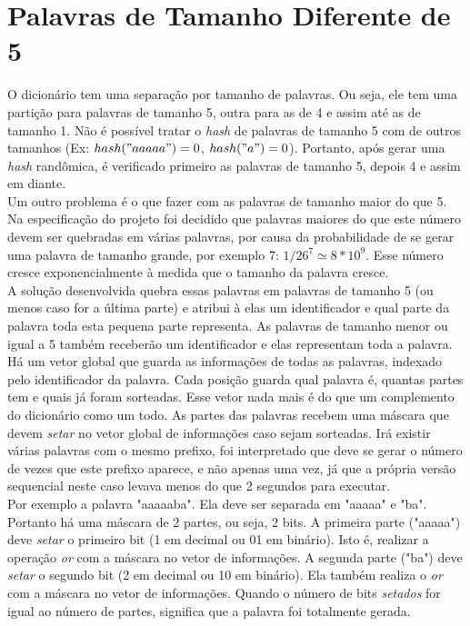 \documentclass[a4paper]{article}
\begin{document}
\section{Palavras de Tamanho Diferente de 5}
\indent \indent O dicionário tem uma separação por tamanho de palavras. Ou seja, ele tem uma partição para palavras de tamanho 5, outra para as de 4 e assim até as de tamanho 1. Não é possível tratar o \emph{hash} de palavras de tamanho 5 com de outros tamanhos (Ex: \begin{math}hash("aaaaa") = 0\end{math}, \begin{math}hash("a") = 0\end{math}). Portanto, após gerar uma \emph{hash} randômica, é verificado primeiro as palavras de tamanho 5, depois 4 e assim em diante.\\
\indent Um outro problema é o que fazer com as palavras de tamanho maior do que 5. Na especificação do projeto foi decidido que palavras maiores do que este número devem ser quebradas em várias palavras, por causa da probabilidade de se gerar uma palavra de tamanho grande, por exemplo 7: \begin{math}1/26^7 \simeq 8*10^9\end{math}. Esse número cresce exponencialmente à medida que o tamanho da palavra cresce.\\
\indent A solução desenvolvida quebra essas palavras em palavras de tamanho 5 (ou menos caso for a última parte) e atribui à elas um identificador e qual parte da palavra toda esta pequena parte representa. As palavras de tamanho menor ou igual a 5 também receberão um identificador e elas representam toda a palavra. Há um vetor global que guarda as informações de todas as palavras, indexado pelo identificador da palavra. Cada posição guarda qual palavra é, quantas partes tem e quais já foram sorteadas. Esse vetor nada mais é do que um complemento do dicionário como um todo. As partes das palavras recebem uma máscara que devem \emph{setar} no vetor global de informações caso sejam sorteadas. Irá existir várias palavras com o mesmo prefixo, foi interpretado que deve se gerar o número de vezes que este prefixo aparece, e não apenas uma vez, já que a própria versão sequencial neste caso levava menos do que 2 segundos para executar.\\
\indent Por exemplo a palavra "aaaaaba". Ela deve ser separada em "aaaaa" e "ba". Portanto há uma máscara de 2 partes, ou seja, 2 bits. A primeira parte ("aaaaa") deve \emph{setar} o primeiro bit (1 em decimal ou 01 em binário). Isto é, realizar a operação \emph{or} com a máscara no vetor de informações. A segunda parte ("ba") deve \emph{setar} o segundo bit (2 em decimal ou 10 em binário). Ela também realiza o \emph{or} com a máscara no vetor de informações. Quando o número de bits \emph{setados} for igual ao número de partes, significa que a palavra foi totalmente gerada.
\end{document}
